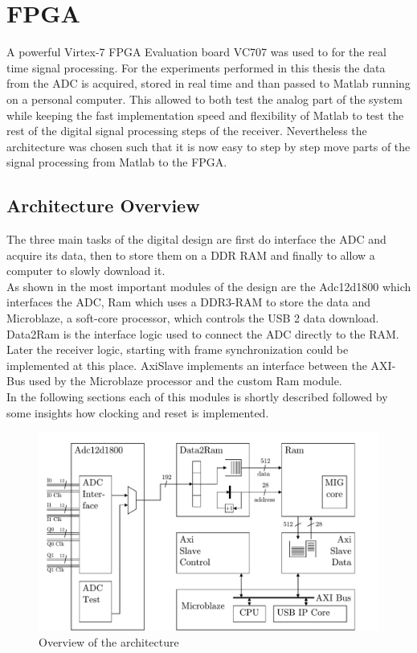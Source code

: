 \chapter{FPGA}
\label{chap:fpga}
A powerful Virtex-7 \gls{FPGA} Evaluation board VC707
was used to for the real time signal processing.
For the experiments performed in this thesis
the data from the \gls{ADC} is acquired, stored in real time
and than passed to Matlab running on a personal computer.
This allowed to both test the analog part of the system
while keeping the fast implementation speed and flexibility of Matlab
to test the rest of the digital signal processing steps of the receiver.
Nevertheless the architecture was chosen such that it is now easy
to step by step move parts of the signal processing from Matlab to the
\gls{FPGA}. \\

\section{Architecture Overview}
The three main tasks of the digital design are first do interface
the \gls{ADC} and acquire its data, then to store them on a
\gls{DDR} \gls{RAM} and finally to allow a computer to
slowly download it. \\

As shown in  the most important
modules of the design are the Adc12d1800 which interfaces the
\gls{ADC}, Ram which uses a \gls{DDR}3-\gls{RAM} to store the data
and Microblaze, a soft-core processor, which controls the
\gls{USB} 2 data download. Data2Ram is the interface logic used
to connect the \gls{ADC} directly to the \gls{RAM}. Later the receiver logic,
starting with frame synchronization could be implemented
at this place. AxiSlave implements an interface between the
\gls{AXI}-Bus used by the Microblaze processor and the custom
Ram module. \\

In the following sections each of this modules is shortly described followed
by some insights how clocking and reset is implemented. \\

\begin{figure}[ht]
  \centering
  \includegraphics[width=\textwidth]{figures/fpga_architecture_overview}
  \caption{Overview of the architecture}
  \label{fig:fpga_architecture_overview}
\end{figure}

